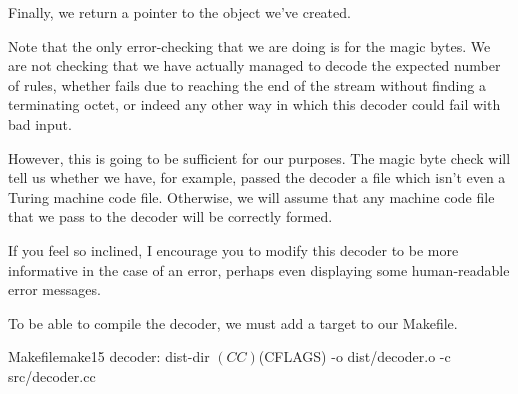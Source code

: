Finally, we return a pointer to the  object we've created.

\begin{file}{src/decoder.cc}{c++}{30}
    return std::make_unique<Program>(program);
}
\end{file}

Note that the only error-checking that we are doing is for the magic bytes. We are not checking that we have actually managed to decode the expected number of rules, whether  fails due to reaching the end of the stream without finding a terminating octet, or indeed any other way in which this decoder could fail with bad input.

However, this is going to be sufficient for our purposes. The magic byte check will tell us whether we have, for example, passed the decoder a file which isn't even a Turing machine code file. Otherwise, we will assume that any machine code file that we pass to the decoder will be correctly formed.

If you feel so inclined, I encourage you to modify this decoder to be more informative in the case of an error, perhaps even displaying some human-readable error messages.

To be able to compile the decoder, we must add a target to our Makefile.

\begin{file}{Makefile}{make}{15}
decoder: dist-dir
	$(CC) $(CFLAGS) -o dist/decoder.o -c src/decoder.cc
\end{file}